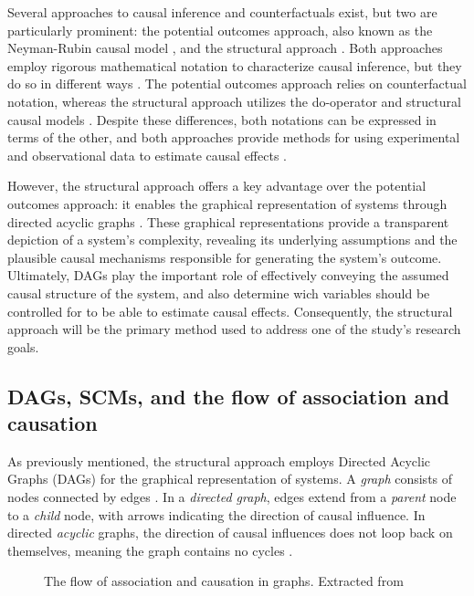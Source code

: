 \documentclass[
  authoryear,
  preprint,
  1p]{elsarticle}
\begin{document}
Several approaches to causal inference and counterfactuals exist, but
two are particularly prominent: the potential outcomes approach, also
known as the Neyman-Rubin causal model
\citep{Neyman_et_al_1923, Rubin_1974}, and the structural approach
\citep{Wright_1921, Pearl_2009, Pearl_et_al_2016}. Both approaches
employ rigorous mathematical notation to characterize causal inference,
but they do so in different ways \citep{Neal_2020}. The potential
outcomes approach relies on counterfactual notation, whereas the
structural approach utilizes the do-operator and structural causal
models \citep[SCM,][]{Pearl_2009, Pearl_et_al_2016}. Despite these
differences, both notations can be expressed in terms of the other, and
both approaches provide methods for using experimental and observational
data to estimate causal effects \citep{Pearl_2010}.

However, the structural approach offers a key advantage over the
potential outcomes approach: it enables the graphical representation of
systems through directed acyclic graphs
\citep[DAG,][]{Gross_et_al_2018, Neal_2020}. These graphical
representations provide a transparent depiction of a system's
complexity, revealing its underlying assumptions and the plausible
causal mechanisms responsible for generating the system's outcome.
Ultimately, DAGs play the important role of effectively conveying the
assumed causal structure of the system, and also determine wich
variables should be controlled for to be able to estimate causal
effects. Consequently, the structural approach will be the primary
method used to address one of the study's research goals.

\subsection{DAGs, SCMs, and the flow of association and
causation}\label{sec-background-dag}

As previously mentioned, the structural approach employs Directed
Acyclic Graphs (DAGs) for the graphical representation of systems. A
\emph{graph} consists of nodes connected by edges
\citep{Gross_et_al_2018}. In a \emph{directed graph}, edges extend from
a \emph{parent} node to a \emph{child} node, with arrows indicating the
direction of causal influence. In directed \emph{acyclic} graphs, the
direction of causal influences does not loop back on themselves, meaning
the graph contains no cycles \citep[@McElreath\_2020]{Neal_2020}.

\begin{figure}


\caption{\label{fig-ACflow}The flow of association and causation in
graphs. Extracted from \citet[31]{Neal_2020}}

\end{figure}%
\end{document}
